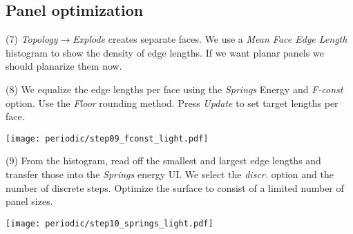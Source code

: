 \documentclass[Thesis.tex]{subfiles}
\begin{document}
\subsection{Panel optimization}

\begin{compactenum}[(1)]
\item[(7)] \emph{Topology$\to$Explode} creates separate faces. We use a \emph{Mean Face Edge Length} histogram to show the density of edge lengths. If we want planar panels we should planarize them now.

\begin{center}
\begin{minipage}{\linewidth}
            \centering
\end{minipage}
\end{center}

\item[(8)] We equalize the edge lengths per face using the \emph{Springs} Energy and \emph{F-const} option. Use the \emph{Floor} rounding method. Press \emph{Update} to set target lengths per face.

\begin{center}
\begin{minipage}{0.7\linewidth}
            \centering
\end{minipage}
\begin{minipage}{0.29\linewidth}
\texttt{[image: periodic/step09\_fconst\_light.pdf]}
\end{minipage}
\end{center}
\item[(9)] From the histogram, read off the smallest and largest edge lengths and transfer those into the \emph{Springs} energy UI. We select the \emph{discr.} option and the number of discrete steps. Optimize the surface to consist of a limited number of panel sizes.

\begin{center}
\begin{minipage}{0.7\linewidth}
            \centering
\end{minipage}
\begin{minipage}{0.29\linewidth}
\texttt{[image: periodic/step10\_springs\_light.pdf]}
\end{minipage}
\end{center}            
\end{compactenum}
\end{document}
